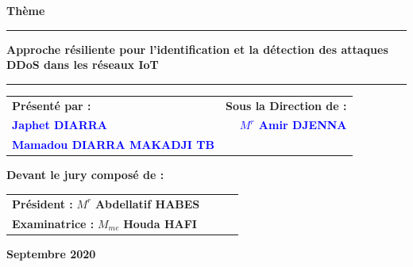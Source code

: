 {\begin{titlepage}
\begin{center}
\vspace{1cm}
\Huge\textbf{Thème }
\noindent\rule{\textwidth}{0.9mm}
\Large{\textbf{Approche résiliente pour l'identif{\kern0pt}ication et la détection des attaques DDoS dans les réseaux IoT}}
\noindent\rule{\textwidth}{0.9mm}
\end{center}
\vspace{1.5cm}
\begin{tabular}{l r}
\hspace{1cm}\textbf{Présenté par :}&\hspace{5cm}\textbf{Sous la Direction de :}\\
\hspace{1cm}\textbf{\textcolor{blue}{Japhet DIARRA }}&\textbf{\textcolor{blue}{$M^{r}$ Amir DJENNA}}\\
\hspace{1cm}\textbf{\textcolor{blue}{ Mamadou DIARRA MAKADJI TB}}&\textbf{}
\end{tabular}
\begin{center}
\vspace{1.5cm}
\hspace{0.3cm}\textbf{\large{Devant le jury composé de : }}\\
\vspace{0.5cm}
\begin{tabular}{llll}
\hspace{0.3cm}\textbf{\textbf{ Président : }} \hspace{0.8cm} $M^{r}$ \textbf{Abdellatif  HABES} \\
\vspace{0.1cm}
\hspace{0.3cm}\textbf{\textbf{Examinatrice : }} \hspace{0.2cm} $M_{me}$ \textbf{Houda  HAFI}
\end{tabular}
\end{center}
\vspace{2cm}
\begin{center}
\textbf{Septembre 2020}
\end{center}
\end{titlepage}
\restoregeometry  
\nopagebreak
}
